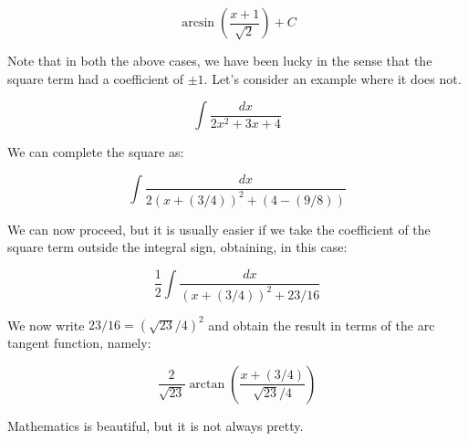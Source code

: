 \documentclass[10pt]{amsart}
\begin{document}
$$\arcsin\left(\frac{x + 1}{\sqrt{2}}\right) + C$$

Note that in both the above cases, we have been lucky in the sense
that the square term had a coefficient of $\pm 1$. Let's consider an
example where it does not.

$$\int \frac{dx}{2x^2 + 3x + 4}$$

We can complete the square as:

$$\int \frac{dx}{2(x + (3/4))^2 + (4 - (9/8))}$$

We can now proceed, but it is usually easier if we take the
coefficient of the square term outside the integral sign, obtaining,
in this case:

$$\frac{1}{2} \int \frac{dx}{(x + (3/4))^2 + 23/16}$$

We now write $23/16 = (\sqrt{23}/4)^2$ and obtain the result in terms
of the arc tangent function, namely:

$$\frac{2}{\sqrt{23}} \arctan\left(\frac{x + (3/4)}{\sqrt{23}/4}\right)$$

Mathematics is beautiful, but it is not always pretty.
\end{document}
